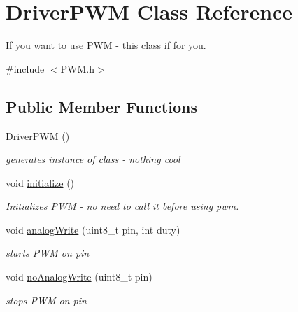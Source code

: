 \hypertarget{class_driver_p_w_m}{}\section{Driver\+P\+W\+M Class Reference}
\label{class_driver_p_w_m}


If you want to use P\+W\+M -\/ this class if for you.  




{\ttfamily \#include $<$P\+W\+M.\+h$>$}

\subsection*{Public Member Functions}
\begin{DoxyCompactItemize}
\item 
\hypertarget{class_driver_p_w_m_acffe6831e34675b688eca8b016c815cd}{}\hyperlink{class_driver_p_w_m_acffe6831e34675b688eca8b016c815cd}{Driver\+P\+W\+M} ()\label{class_driver_p_w_m_acffe6831e34675b688eca8b016c815cd}

\begin{DoxyCompactList}\small\item\em generates instance of class -\/ nothing cool \end{DoxyCompactList}\item 
\hypertarget{class_driver_p_w_m_a4c2173c8d360f3581ebc81f6a3a0bdb1}{}void \hyperlink{class_driver_p_w_m_a4c2173c8d360f3581ebc81f6a3a0bdb1}{initialize} ()\label{class_driver_p_w_m_a4c2173c8d360f3581ebc81f6a3a0bdb1}

\begin{DoxyCompactList}\small\item\em Initializes P\+W\+M -\/ no need to call it before using pwm. \end{DoxyCompactList}\item 
\hypertarget{class_driver_p_w_m_abf80bffdbf8f2fe60bd58d132457cf73}{}void \hyperlink{class_driver_p_w_m_abf80bffdbf8f2fe60bd58d132457cf73}{analog\+Write} (uint8\+\_\+t pin, int duty)\label{class_driver_p_w_m_abf80bffdbf8f2fe60bd58d132457cf73}

\begin{DoxyCompactList}\small\item\em starts P\+W\+M on pin \end{DoxyCompactList}\item 
\hypertarget{class_driver_p_w_m_a202cd541c9f1b791129e63f01c9a1c2b}{}void \hyperlink{class_driver_p_w_m_a202cd541c9f1b791129e63f01c9a1c2b}{no\+Analog\+Write} (uint8\+\_\+t pin)\label{class_driver_p_w_m_a202cd541c9f1b791129e63f01c9a1c2b}

\begin{DoxyCompactList}\small\item\em stops P\+W\+M on pin \end{DoxyCompactList}\end{DoxyCompactItemize}

